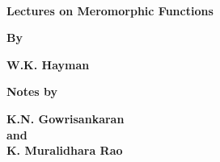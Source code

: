 ~\phantom{a}
\thispagestyle{empty}
\vfill


\begin{center}
{\Large\bf Lectures on Meromorphic Functions}
\vskip 1cm

{\bf By}
\medskip

{\large\bf W.K. Hayman}
\end{center}
\vfill 

\begin{center}
{\bf Notes by}\\
\medskip

{\large\bf K.N. Gowrisankaran}\\[10pt]
{\bf and}\\[10pt]
{\large\bf K. Muralidhara Rao}
\end{center}
\vfill

